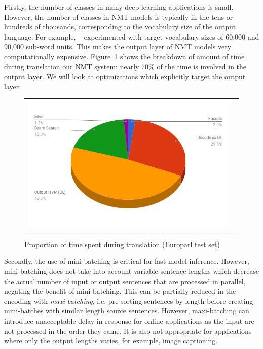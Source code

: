 \documentclass[11pt,a4paper]{article}
\begin{document}
Firstly, the number of classes in many deep-learning applications is small. However, the number of classes in NMT models is typically in the tens or hundreds of thousands, corresponding to the vocabulary size of the output language. For example, ~\cite{sennrich-haddow-birch:2016:P16-12} experimented with target vocabulary sizes of 60,000 and 90,000 sub-word units. This makes the output layer of NMT models very computationally expensive. Figure~\ref{fig:pie-time-europarl} shows the breakdown of amount of time during translation our NMT system; nearly 70\% of the time is involved in the output layer. We will look at optimizations which explicitly target the output layer.
\begin{figure}
\centering
\begin{tabular}{cc}
{\includegraphics[scale=0.3]{pie-time-europarl.png}} 
\end{tabular}
\caption{Proportion of time spent during translation (Europarl test set)}
\label{fig:pie-time-europarl}
\end{figure} 

Secondly, the use of mini-batching is critical for fast model inference. However, mini-batching does not take into account variable sentence lengths which decrease the actual number of input or output sentences that are processed in parallel, negating the benefit of mini-batching. This can be partially reduced in the encoding with \emph{maxi-batching}, i.e. pre-sorting sentences by length before creating mini-batches with similar length source sentences. However, maxi-batching can introduce unacceptable delay in response for online applications as the input are not processed in the order they came. It is also not appropriate for applications where only the output lengths varies, for example, image captioning.
\end{document}
